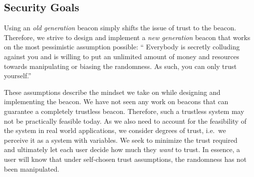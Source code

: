 \subsection{Security Goals}\label{sec:security_goals}
Using an \emph{old generation} beacon simply shifts the issue of trust to the beacon.
Therefore, we strive to design and implement a \emph{new generation} beacon that works on the most pessimistic assumption possible:
\enquote{%
Everybody is secretly colluding against you and is willing to put an unlimited amount of money and resources towards manipulating or biasing the randomness.
As such, you can only trust yourself.}

These assumptions describe the mindset we take on while designing and implementing the beacon.
We have not seen any work on beacons that can guarantee a completely trustless beacon.
Therefore, such a trustless system may not be practically feasible today.
As we also need to account for the feasibility of the system in real world applications, we consider degrees of trust, i.e.\ we perceive it as a system with variables.
We seek to minimize the trust required and ultimately let each user decide how much they \emph{want} to trust.
In essence, a user will know that under self-chosen trust assumptions, the randomness has not been manipulated.

